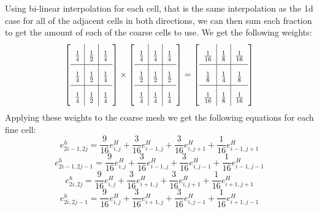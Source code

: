 \documentclass[12pt]{extarticle}
\begin{document}
\begin{enumerate}[(a)]
        Using bi-linear interpolation for each cell, that is the same interpolation as the 1d case for all of the adjacent cells in both directions, we can then sum each fraction to get the amount of each of the coarse cells to use. We get the following weights:
        \begin{equation*}
            \renewcommand{\arraystretch}{2}
            \left[ \begin{array}{c | c | c}
            \frac{1}{4} & \frac{1}{2} & \frac{1}{4} \\
            \hline
            \frac{1}{4} & \frac{1}{2} & \frac{1}{4} \\
            \hline
            \frac{1}{4} & \frac{1}{2} & \frac{1}{4}
            \end{array} \right]
            \times
            \renewcommand{\arraystretch}{2}
            \left[ \begin{array}{c|c|c}
            \frac{1}{4} & \frac{1}{4} & \frac{1}{4} \\
            \hline
            \frac{1}{2} & \frac{1}{2} & \frac{1}{2} \\
            \hline
            \frac{1}{4} & \frac{1}{4} & \frac{1}{4}
            \end{array} \right]
            =
            \renewcommand{\arraystretch}{2}
            \left[ \begin{array}{c|c|c}
            \frac{1}{16} & \frac{1}{8} & \frac{1}{16} \\
            \hline
            \frac{1}{8} & \frac{1}{4} & \frac{1}{8} \\
            \hline
            \frac{1}{16} & \frac{1}{8} & \frac{1}{16}
            \end{array} \right]
        \end{equation*}
        Applying these weights to the coarse mesh we get the following equations for each fine cell:
        \begin{equation*}
            e^h_{2i-1,2j} = \frac{9}{16}e^H_{i,j} + \frac{3}{16}e^H_{i-1,j} + \frac{3}{16}e^H_{i,j+1} + \frac{1}{16}e^H_{i-1,j+1}
        \end{equation*}
        \begin{equation*}
            e^h_{2i-1,2j-1} = \frac{9}{16}e^H_{i,j} + \frac{3}{16}e^H_{i-1,j} + \frac{3}{16}e^H_{i,j-1} + \frac{1}{16}e^H_{i-1,j-1}
        \end{equation*}
        \begin{equation*}
            e^h_{2i,2j} = \frac{9}{16}e^H_{i,j} + \frac{3}{16}e^H_{i+1,j} + \frac{3}{16}e^H_{i,j+1} + \frac{1}{16}e^H_{i+1,j+1}
        \end{equation*}
        \begin{equation*}
            e^h_{2i,2j-1} = \frac{9}{16}e^H_{i,j} + \frac{3}{16}e^H_{i+1,j} + \frac{3}{16}e^H_{i,j-1} + \frac{1}{16}e^H_{i+1,j-1}
        \end{equation*}
\end{enumerate}
\end{document}
